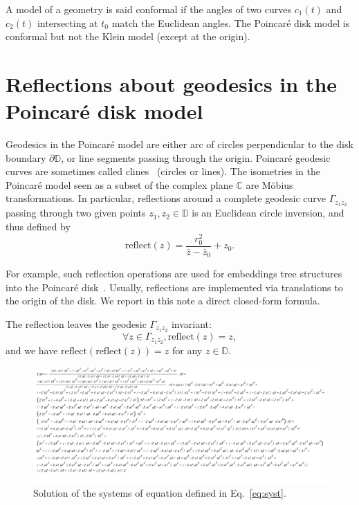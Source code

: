 \documentclass{article}
\def\bbD{\mathbb{D}}
\def\bbC{\mathbb{C}}
\begin{document}
A model of a geometry is said conformal if the angles of two curves $c_1(t)$ and $c_2(t)$ intersecting at $t_0$ match the Euclidean angles.
The Poincar\'e disk model is conformal but not the Klein model (except at the origin).

\def\reflect{\mathrm{reflect}}
\section{Reflections about geodesics in the Poincar\'e disk model}

Geodesics in the Poincar\'e model  are either arc of circles perpendicular to the disk boundary $\partial\bbD$, or line segments passing through the origin.
Poincar\'e geodesic curves are sometimes called clines~\cite{hitchman2009geometry} (circles or lines).
The isometries in the  Poincar\'e model seen as a subset of the complex plane $\bbC$ are M\"obius transformations.
In particular, reflections around a complete geodesic curve $\Gamma_{z_1z_2}$ passing through two given points $z_1, z_2\in\bbD$ is an Euclidean circle inversion, and thus defined by
$$
\reflect(z)=\frac{r_0^2}{\bar{z}-\bar{z}_0}+z_0.
$$


For example, such reflection operations are used for embeddings tree structures into the Poincar\'e disk~\cite{sala2018representation}.
Usually, reflections are implemented via translations to the origin of the disk. We report in this note a direct closed-form formula.


The reflection leaves the geodesic $\Gamma_{z_1z_2}$ invariant:
$$
\forall z\in \Gamma_{z_1z_2}, \reflect(z)=z,
$$
and we have $\reflect(\reflect(z))=z$ for any $z\in\bbD$.

\begin{figure}
\begin{center}
\includegraphics[width=\textwidth]{ReflectionPoincare3Points.png}
 \end{center}
\caption{Solution of the systems of equation defined in Eq.~\ref{eq:syst}.\label{fig:solve} }
\end{figure}
\end{document}
